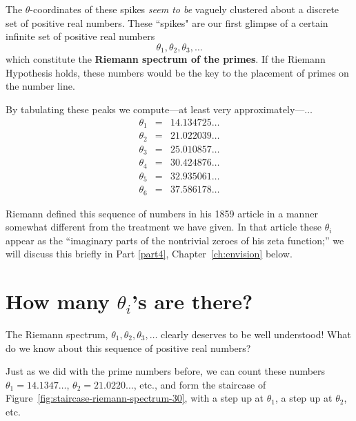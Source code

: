 \documentclass[openany]{book}
\theoremstyle{plain}
\theoremstyle{definition}
\newcommand{\RH}{Riemann Hypothesis\index{Riemann Hypothesis}}
\begin{document}
{%

The $\theta$-coordinates of these spikes  {\it seem to be}
vaguely clustered about a discrete set of positive real numbers.
These ``spikes" are our first glimpse of a
certain infinite set of positive real numbers
 $$\theta_1,\theta_2,\theta_3,\dots$$ which constitute the {\bf Riemann spectrum of
  the primes}. If the \RH{} holds, these numbers would
be the key to the placement of primes on the number line.








By tabulating these peaks we compute---at least very approximately---$\dots$
\begin{eqnarray*}
\theta_1 &=& 14.134725 \dots\\
\theta_2 &=& 21.022039 \dots\\
\theta_3 &=& 25.010857 \dots\\
\theta_4 &=& 30.424876 \dots\\
\theta_5 &=& 32.935061 \dots\\
\theta_6 &=& 37.586178 \dots
\end{eqnarray*}

Riemann defined this sequence of numbers in his 1859 article in a
manner somewhat different from the treatment we have given.  In that
article these $\theta_i$ appear as the ``imaginary parts of the
nontrivial zeroes of his zeta function;'' we will discuss this
briefly in Part \ref{part4}, Chapter~\ref{ch:envision} below.




\chapter{How many $\theta_i$'s are there?}

  The Riemann spectrum, $\theta_1, \theta_2, \theta_3, \dots$ clearly deserves to be well understood!  What do we know about this sequence of positive real numbers?

Just as we did with the prime numbers before, we can count
these numbers $\theta_1=14.1347\ldots$,
$\theta_2=21.0220\ldots$, etc., and form the staircase
of Figure~\ref{fig:staircase-riemann-spectrum-30},
with a step up at $\theta_1$, a step up at $\theta_2$, etc.

}
\end{document}
